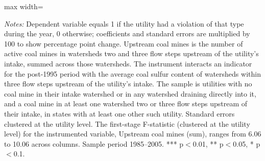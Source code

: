 \begin{table}[htbp]
{\begin{adjustbox}{max width=\linewidth}
\begin{tabular}
\end{tabular}
\end{adjustbox}
}
\begin{minipage}{\linewidth}
\vspace{4pt}
\footnotesize
\raggedright
\textit{Notes:} Dependent variable equals 1 if the utility had a violation of that type during the year, 0 otherwise; coefficients and standard errors are multiplied by 100 to show percentage point change. Upstream coal mines is the number of active coal mines in watersheds two and three flow steps upstream of the utility's intake, summed across those watersheds. The instrument interacts an indicator for the post-1995 period with the average coal sulfur content of watersheds within three flow steps upstream of the utility's intake. The sample is utilities with no coal mine in their intake watershed or in any watershed draining directly into it, and a coal mine in at least one watershed two or three flow steps upstream of their intake, in states with at least one other such utility. Standard errors clustered at the utility level. The first-stage F-statistic (clustered at the utility level) for the instrumented variable, Upstream coal mines (sum), ranges from 6.06 to 10.06 across columns. Sample period 1985--2005. *** p$<$0.01, ** p$<$0.05, * p$<$0.1.
\end{minipage}
\end{table}

